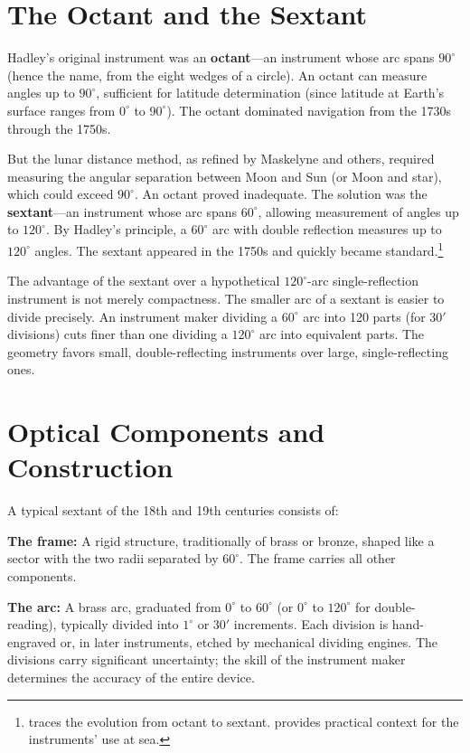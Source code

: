 \section{The Octant and the Sextant}

Hadley's original instrument was an \textbf{octant}---an instrument whose arc spans $90^{\circ}$ (hence the name, from the eight wedges of a circle). An octant can measure angles up to $90^{\circ}$, sufficient for latitude determination (since latitude at Earth's surface ranges from $0^{\circ}$ to $90^{\circ}$). The octant dominated navigation from the 1730s through the 1750s.

But the lunar distance method, as refined by Maskelyne and others, required measuring the angular separation between Moon and Sun (or Moon and star), which could exceed $90^{\circ}$. An octant proved inadequate. The solution was the \textbf{sextant}---an instrument whose arc spans $60^{\circ}$, allowing measurement of angles up to $120^{\circ}$. By Hadley's principle, a $60^{\circ}$ arc with double reflection measures up to $120^{\circ}$ angles. The sextant appeared in the 1750s and quickly became standard.\footnote{\textcite{Cotter1968} traces the evolution from octant to sextant. \textcite{Ifland2005} provides practical context for the instruments' use at sea.}

The advantage of the sextant over a hypothetical $120^{\circ}$-arc single-reflection instrument is not merely compactness. The smaller arc of a sextant is easier to divide precisely. An instrument maker dividing a $60^{\circ}$ arc into 120 parts (for $30'$ divisions) cuts finer than one dividing a $120^{\circ}$ arc into equivalent parts. The geometry favors small, double-reflecting instruments over large, single-reflecting ones.

\section{Optical Components and Construction}

A typical sextant of the 18th and 19th centuries consists of:

\textbf{The frame:} A rigid structure, traditionally of brass or bronze, shaped like a sector with the two radii separated by $60^{\circ}$. The frame carries all other components.

\textbf{The arc:} A brass arc, graduated from $0^{\circ}$ to $60^{\circ}$ (or $0^{\circ}$ to $120^{\circ}$ for double-reading), typically divided into $1^{\circ}$ or $30'$ increments. Each division is hand-engraved or, in later instruments, etched by mechanical dividing engines. The divisions carry significant uncertainty; the skill of the instrument maker determines the accuracy of the entire device.

